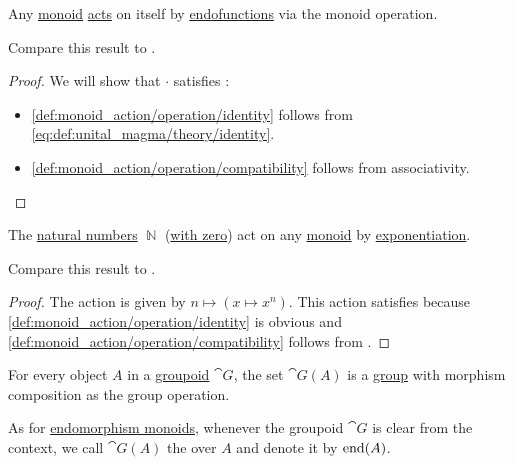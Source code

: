 \begin{proposition}\label{thm:monoid_is_action}
  Any \hyperref[def:unital_magma/monoid]{monoid} \hyperref[def:monoid_action]{acts} on itself by \hyperref[def:multi_valued_function/endofunction]{endofunctions} via the monoid operation.

  Compare this result to .
\end{proposition}
\begin{proof}
  We will show that \( \cdot \) satisfies :
  \begin{itemize}
    \item \ref{def:monoid_action/operation/identity} follows from \eqref{eq:def:unital_magma/theory/identity}.

    \item \ref{def:monoid_action/operation/compatibility} follows from associativity.
  \end{itemize}
\end{proof}

\begin{proposition}\label{thm:natural_numbers_monoid_action}
  The \hyperref[def:set_of_natural_numbers]{natural numbers} \( \BbbN \) (\hyperref[rem:peano_arithmetic_zero]{with zero}) act on any \hyperref[def:unital_magma/monoid]{monoid} by \hyperref[def:unital_magma/exponentiation]{exponentiation}.

  Compare this result to .
\end{proposition}
\begin{proof}
  The action is given by \( n \mapsto (x \mapsto x^n) \). This action satisfies  because \ref{def:monoid_action/operation/identity} is obvious and \ref{def:monoid_action/operation/compatibility} follows from .
\end{proof}

\begin{definition}\label{def:automorphism_group}
  For every object \( A \) in a \hyperref[def:groupoid]{groupoid} \( \cat{G} \), the set \( \cat{G}(A) \) is a \hyperref[def:group]{group} with morphism composition as the group operation.

  As for \hyperref[def:endomorphism_monoid]{endomorphism monoids}, whenever the groupoid \( \cat{G} \) is clear from the context, we call \( \cat{G}(A) \) the  over \( A \) and denote it by \( \operatorname{end}(A) \).
\end{definition}


